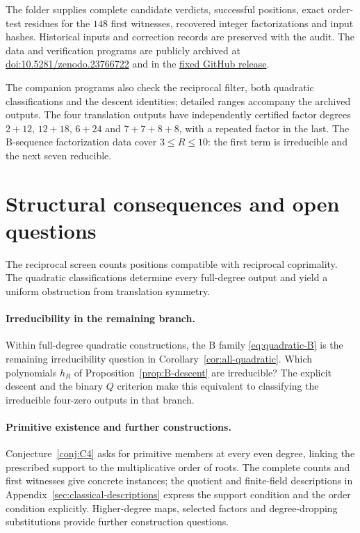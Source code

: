 \documentclass[11pt]{article}
\theoremstyle{definition}
\theoremstyle{remark}
\begin{document}
The folder  supplies complete candidate
verdicts, successful positions, exact order-test residues for the $148$
first witnesses, recovered integer factorizations and input hashes.
Historical inputs and correction records are preserved with the audit.
The data and verification programs are publicly archived at
\href{https://doi.org/10.5281/zenodo.23766722}{doi:10.5281/zenodo.23766722}
and in the
\href{https://github.com/63331849121/yijing-mathematical-structures/tree/paperF-v2026.10.29-r1/PaperF_fourzero}{fixed GitHub release}.

The companion programs also check the reciprocal filter, both quadratic
classifications and the descent identities; detailed ranges accompany
the archived outputs.
The four translation outputs have independently certified factor degrees
$2+12$, $12+18$, $6+24$ and $7+7+8+8$, with a repeated factor in the last.
The B-sequence factorization data cover $3\le R\le10$:
the first term is irreducible and the next seven reducible.

\section{Structural consequences and open questions}\label{sec:limits}
The reciprocal screen counts positions compatible with reciprocal
coprimality. The quadratic classifications determine every full-degree
output and yield a uniform obstruction from translation symmetry.

\paragraph{Irreducibility in the remaining branch.}
Within full-degree quadratic constructions, the B family
\eqref{eq:quadratic-B} is the remaining irreducibility question in
Corollary~\ref{cor:all-quadratic}. Which polynomials $h_R$ of
Proposition~\ref{prop:B-descent} are irreducible? The explicit descent and the
binary $Q$ criterion make this equivalent to classifying the irreducible
four-zero outputs in that branch.

\paragraph{Primitive existence and further constructions.}
Conjecture~\ref{conj:C4} asks for primitive members at every even degree,
linking the prescribed support to the multiplicative order of roots.
The complete counts and first witnesses give concrete instances; the
quotient and finite-field descriptions in
Appendix~\ref{sec:classical-descriptions} express the support condition
and the order condition explicitly. Higher-degree maps, selected factors and degree-dropping
substitutions provide further construction questions.
\end{document}
